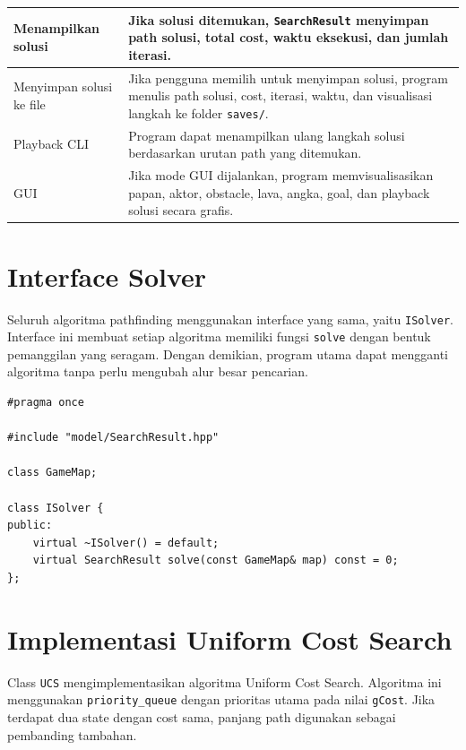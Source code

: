 \begin{longtable}{|p{4.5cm}|p{9.5cm}|}
	\hline
	Menampilkan solusi & Jika solusi ditemukan, \texttt{SearchResult} menyimpan path solusi, total cost, waktu eksekusi, dan jumlah iterasi. \\
	\hline
	Menyimpan solusi ke file & Jika pengguna memilih untuk menyimpan solusi, program menulis path solusi, cost, iterasi, waktu, dan visualisasi langkah ke folder \texttt{saves/}. \\
	\hline
	Playback CLI & Program dapat menampilkan ulang langkah solusi berdasarkan urutan path yang ditemukan. \\
	\hline
	GUI & Jika mode GUI dijalankan, program memvisualisasikan papan, aktor, obstacle, lava, angka, goal, dan playback solusi secara grafis. \\
	\hline
\end{longtable}

\section{Interface Solver}

Seluruh algoritma pathfinding menggunakan interface yang sama, yaitu \texttt{ISolver}. 
Interface ini membuat setiap algoritma memiliki fungsi \texttt{solve} dengan bentuk pemanggilan yang seragam. 
Dengan demikian, program utama dapat mengganti algoritma tanpa perlu mengubah alur besar pencarian.

\begin{tcolorbox}[
	colback=green!5,
	colframe=green!50!black,
	title=\textbf{Potongan Source Code Asli: \texttt{ISolver.hpp}},
	arc=2mm,
	boxrule=0.8pt
]
\small
\begin{verbatim}
#pragma once

#include "model/SearchResult.hpp"

class GameMap;

class ISolver {
public:
    virtual ~ISolver() = default;
    virtual SearchResult solve(const GameMap& map) const = 0;
};
\end{verbatim}
\end{tcolorbox}

\section{Implementasi Uniform Cost Search}

Class \texttt{UCS} mengimplementasikan algoritma Uniform Cost Search. 
Algoritma ini menggunakan \texttt{priority\_queue} dengan prioritas utama pada nilai \texttt{gCost}. 
Jika terdapat dua state dengan cost sama, panjang path digunakan sebagai pembanding tambahan.

